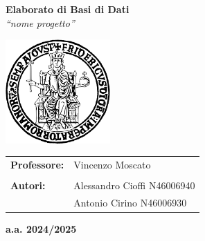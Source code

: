 \begin{introduzione}
    \begin{center}
        \Large
        \textbf{Elaborato di Basi di Dati} \\
        \vspace{0.5cm}
        \Huge
        \textit{``nome progetto''} \\

        \vspace{2cm}

        \includegraphics[width=0.3\textwidth]{Media/logo_unina.png} \\ 

        \vspace{2cm}

        \Large
        \begin{tabular}{l l}
            \textbf{Professore:} & Vincenzo Moscato \\\\
            \textbf{Autori:} & Alessandro Cioffi \hfill N46006940 \\
                             & Antonio Cirino \hfill N46006930 \\
        \end{tabular}

        \vfill

        \textbf{a.a. 2024/2025}
    \end{center}
\end{introduzione}
